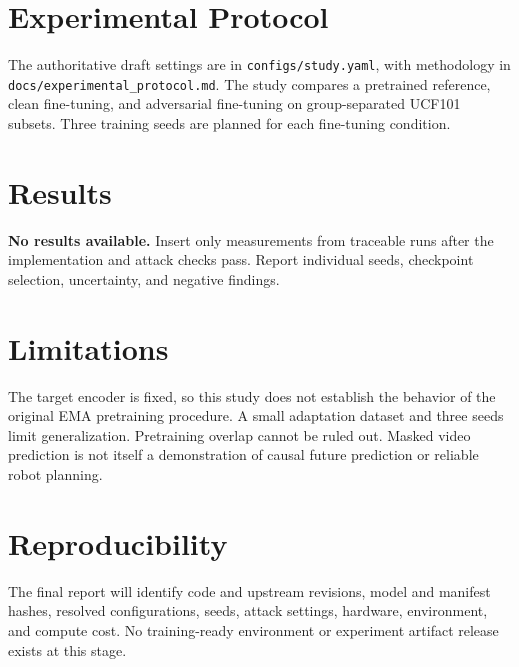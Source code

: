 \documentclass[11pt]{article}
\begin{document}
\section{Experimental Protocol}
The authoritative draft settings are in \texttt{configs/study.yaml},
with methodology in \texttt{docs/experimental\_protocol.md}.
The study compares a pretrained reference, clean fine-tuning, and
adversarial fine-tuning on group-separated UCF101 subsets. Three
training seeds are planned for each fine-tuning condition.

\section{Results}
\textbf{No results available.} Insert only measurements from traceable
runs after the implementation and attack checks pass. Report individual
seeds, checkpoint selection, uncertainty, and negative findings.

\section{Limitations}
The target encoder is fixed, so this study does not establish the
behavior of the original EMA pretraining procedure. A small adaptation
dataset and three seeds limit generalization. Pretraining overlap cannot
be ruled out. Masked video prediction is not itself a demonstration of
causal future prediction or reliable robot planning.

\section{Reproducibility}
The final report will identify code and upstream revisions, model and
manifest hashes, resolved configurations, seeds, attack settings,
hardware, environment, and compute cost. No training-ready environment
or experiment artifact release exists at this stage.



\end{document}
